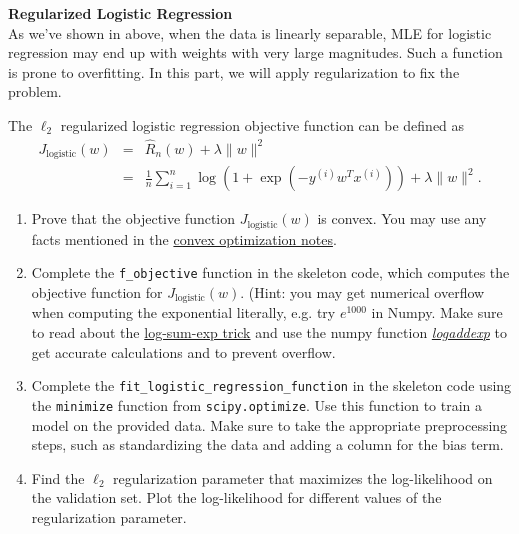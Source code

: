 \documentclass{article}
\newcommand{\nyuparagraph}[1]{\vspace{0.3cm}\textcolor{nyupurple}{\bf \large #1}\\}
\theoremstyle{plain}
\theoremstyle{definition}
\begin{document}
\nyuparagraph{\label{subsec:Regularized-Logistic-Regression}Regularized Logistic
Regression}
As we've shown in above, when the data is linearly separable,
MLE for logistic regression may end up with weights with very large magnitudes. Such a function is prone to overfitting.
In this part, we will apply regularization to fix the problem.

The $\ell_2$ regularized
logistic regression objective function can be defined as
\begin{eqnarray*}
J_{\text{logistic}}(w) & = & \hat{R}_{n}(w)+\lambda\|w\|^{2}\\
 & = & \frac{1}{n}\sum_{i=1}^{n}\log\left(1+\exp\left(-y^{(i)}w^{T}x^{(i)}\right)\right)+\lambda\|w\|^{2}.
\end{eqnarray*}
 
\begin{enumerate}
  \setcounter{enumi}{\value{saveenum}}
\item Prove that the objective function $J_{\text{logistic}}(w)$ is convex.
You may use any facts mentioned in the \href{https://davidrosenberg.github.io/mlcourse/Notes/convex-optimization.pdf}{convex optimization notes}.

\item Complete the \texttt{f\_objective} function in the skeleton code,
which computes the objective function for $J_{\text{logistic}}(w)$.
(Hint: you may get numerical overflow when computing the exponential literally,
e.g. try $e^{1000}$ in Numpy.
Make sure to read about the
\href{https://blog.feedly.com/tricks-of-the-trade-logsumexp/}{log-sum-exp trick}
and use the numpy function
\textit{ \href{https://docs.scipy.org/doc/numpy/reference/generated/numpy.logaddexp.html}{logaddexp}
}
to get accurate calculations
and to prevent overflow.

\item Complete the \texttt{fit\_logistic\_regression\_function} in the skeleton
code using the \texttt{minimize} function from \texttt{scipy.optimize}.
Use this function to train
a model on the provided data. Make sure to take the appropriate preprocessing
steps, such as standardizing the data and adding a column for the
bias term. 

\item Find the $\ell_{2}$ regularization parameter that maximizes the log-likelihood
on the validation set. Plot the log-likelihood for different values
of the regularization parameter. 


\end{enumerate}
\end{document}
